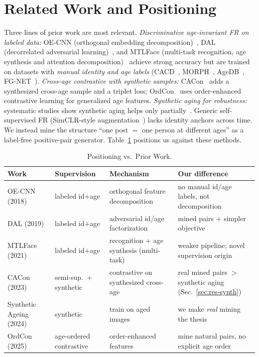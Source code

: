 \documentclass[journal]{IEEEtran}
\begin{document}
\section{Related Work and Positioning}\label{sec:related}
Three lines of prior work are most relevant. \emph{Discriminative age-invariant FR on labeled data:} OE-CNN (orthogonal embedding decomposition)~\cite{wang2018oecnn}, DAL (decorrelated adversarial learning)~\cite{wang2019dal}, and MTLFace (multi-task recognition, age synthesis and attention decomposition)~\cite{huang2021mtlface} achieve strong accuracy but are trained on datasets with \emph{manual identity and age labels} (CACD~\cite{chen2014cacd}, MORPH~\cite{ricanek2006morph}, AgeDB~\cite{moschoglou2017agedb}, FG-NET~\cite{panis2016fgnet}). \emph{Cross-age contrastive with synthetic samples:} CACon~\cite{wang2024cacon} adds a synthesized cross-age sample and a triplet loss; OrdCon~\cite{wang2025ordcon} uses order-enhanced contrastive learning for generalized age features. \emph{Synthetic aging for robustness:} systematic studies show synthetic aging helps only partially~\cite{yao2024synthageing}. Generic self-supervised FR (SimCLR-style augmentation~\cite{chen2020simclr}) lacks identity anchors across time. We instead mine the structure ``one post $=$ one person at different ages'' as a label-free positive-pair generator. Table~\ref{tab:positioning} positions us against these methods.

\begin{table}[!t]
\renewcommand{\arraystretch}{1.25}
\caption{Positioning vs.\ Prior Work.}
\label{tab:positioning}
\centering
\footnotesize
\begin{tabular}{@{}p{}p{}p{}p{}@{}}
\toprule
Work & Supervision & Mechanism & Our difference \\
\midrule
OE-CNN (2018)~\cite{wang2018oecnn} & labeled id$+$age & orthogonal feature decomposition & no manual id/age labels, not decomposition \\
DAL (2019)~\cite{wang2019dal} & labeled id$+$age & adversarial id/age factorization & mined pairs $+$ simpler objective \\
MTLFace (2021)~\cite{huang2021mtlface} & labeled id$+$age & recognition $+$ age synthesis (multi-task) & weaker pipeline; novel supervision origin \\
CACon (2023)~\cite{wang2024cacon} & semi-sup.\ $+$ synthetic & contrastive on synthesized cross-age & real mined pairs $>$ synthetic aging (Sec.~\ref{sec:res-synth}) \\
Synthetic Ageing (2024)~\cite{yao2024synthageing} & synthetic & train on aged images & we make \emph{real} mining the thesis \\
OrdCon (2025)~\cite{wang2025ordcon} & age-ordered contrastive & order-enhanced features & mine natural pairs, no explicit age order \\
\bottomrule
\end{tabular}
\end{table}
\end{document}
